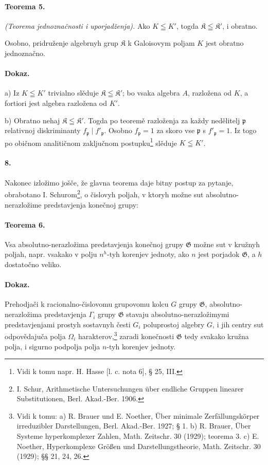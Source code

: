 \documentclass[11pt]{article}
\newcommand{\foreign}[1]{#1}
\begin{document}
\paragraph{Teorema 5.}
\emph{(Teorema jednoznačnosti i uporjadženja).} Ako \(K\leqq K'\), togda \(\mathfrak K\leqq\mathfrak K'\), i obratno.

Osobno, pridruženje algebrnyh grup \(\mathfrak K\) k Galoisovym poljam \(K\) jest obratno jednoznačno.

\paragraph{Dokaz.}
a) Iz \(K\leqq K'\) trivialno slěduje \(\mathfrak K\leqq\mathfrak K'\); bo vsaka algebra \(A\), razložena od \(K\), a fortiori jest algebra razložena od \(K'\).

b) Obratno nehaj \(\mathfrak K\leqq\mathfrak K'\). Togda po teoremě razloženja za každy nedělitelj \(\mathfrak p\) relativnoj diskriminanty \(f_{\mathfrak p}\mid f'_{\mathfrak p}\). Osobno \(f_{\mathfrak p}=1\) za skoro vse \(\mathfrak p\) s \(f'_{\mathfrak p}=1\). Iz togo po običnom analitičnom zaključnom postupku\footnote{Vidi k tomu napr. H. Hasse [l. c. nota 6], § 25, III.} slěduje \(K\leqq K'\).

\paragraph{8.}
Nakonec izložimo jošče, že glavna teorema daje bitny postup za pytanje, obrabotano I. Schurom\footnote{\foreign{I. Schur, Arithmetische Untersuchungen über endliche Gruppen linearer Substitutionen, Berl. Akad.-Ber. 1906}.}, o čislovyh poljah, v ktoryh možne sut absolutno-nerazložime predstavjenja konečnoj grupy:

\paragraph{Teorema 6.}
Vsa absolutno-nerazložima predstavjenja konečnoj grupy \(\mathfrak G\) možne sut v kružnyh poljah, napr. vsakako v polju \(n^h\)-tyh korenjev jednoty, ako \(n\) jest porjadok \(\mathfrak G\), a \(h\) dostatočno veliko.

\paragraph{Dokaz.}
Prehodjači k racionalno-čislovomu grupovomu kolcu \(G\) grupy \(\mathfrak G\), absolutno-nerazložima predstavjenja \(\Gamma_i\) grupy \(\mathfrak G\) stavaju absolutno-nerazložimymi predstavjenjami prostyh sostavnyh česti \(G_i\) poluprostoj algebry \(G\), i jih centry sut odpovědajuča polja \(\Omega_i\) harakterov,\footnote{Vidi k tomu: a) \foreign{R. Brauer und E. Noether, Über minimale Zerfällungskörper irreduzibler Darstellungen, Berl. Akad.-Ber. 1927; § 1.} b) \foreign{R. Brauer, Über Systeme hyperkomplexer Zahlen, Math. Zeitschr. 30 (1929);} teorema 3. c) \foreign{E. Noether, Hyperkomplexe Größen und Darstellungstheorie, Math. Zeitschr. 30 (1929); §§ 21, 24, 26.}} zaradi konečnosti \(\mathfrak G\) tedy svakako kružna polja, i sigurno podpolja polja \(n\)-tyh korenjev jednoty.
\end{document}

